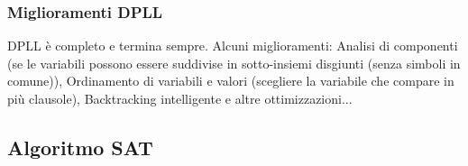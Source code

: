 \documentclass{article}
\begin{document}
\subsubsection{Miglioramenti DPLL}
DPLL è completo e termina sempre. Alcuni miglioramenti: Analisi di componenti (se le variabili possono essere suddivise in sotto-insiemi disgiunti (senza simboli in comune)), Ordinamento di variabili e valori (scegliere la variabile che compare in più clausole), Backtracking intelligente e altre ottimizzazioni...
\subsection{Algoritmo SAT}























\end{document}
